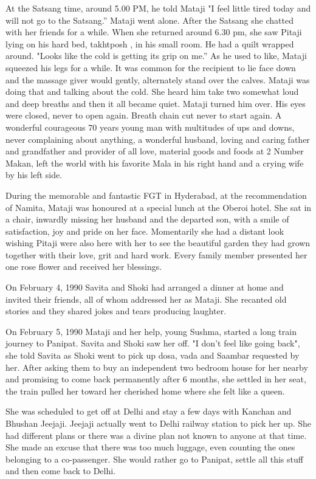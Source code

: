 At the Satsang time, around 5.00 PM, he told Mataji "I feel little tired
today and will not go to the Satsang.” Mataji went alone. After the
Satsang she chatted with her friends for a while. When she returned around
6.30 pm, she saw Pitaji lying on his hard bed, takhtposh , in his small
room. He had a quilt wrapped around. "Looks like the cold is getting its
grip on me.” As he used to like, Mataji squeezed his legs for a while. It
was common for the recipient to lie face down and the massage giver would
gently, alternately stand over the calves. Mataji was doing that and
talking about the cold. She heard him take two somewhat loud and deep
breaths and then it all became quiet. Mataji turned him over. His eyes
were closed, never to open again. Breath chain cut never to start again.
A wonderful courageous 70 years young man with multitudes of ups and
downs, never complaining about anything, a wonderful husband, loving and
caring father and grandfather and provider of all love, material goods and
foods at 2 Number Makan, left the world with his favorite Mala in his
right hand and a crying wife by his left side. 

During the memorable and fantastic FGT in Hyderabad, at the recommendation
of Namita, Mataji was honoured at a special lunch at the Oberoi hotel. She
sat in a chair, inwardly missing her husband and the departed son, with
a smile of satisfaction, joy and pride on her face. Momentarily she had
a distant look wishing Pitaji were also here with her to see the beautiful
garden they had grown together with their love, grit and hard work. Every
family member presented her one rose flower and received her blessings. 

On February 4, 1990 Savita and Shoki had arranged a dinner at home and
invited their friends, all of whom addressed her as Mataji. She recanted
old stories and they shared jokes and tears producing laughter. 

On February 5, 1990 Mataji and her help, young Sushma, started a long
train journey to Panipat. Savita and Shoki saw her off. "I don't feel like
going back", she told Savita as Shoki went to pick up dosa, vada and
Saambar requested by her. After asking them to buy an independent two
bedroom house for her nearby and promising to come back permanently after
6 months, she settled in her seat, the train pulled her toward her
cherished home where she felt like a queen. 

She was scheduled to get off at Delhi and stay a few days with Kanchan and
Bhushan Jeejaji. Jeejaji actually went to Delhi railway station to pick
her up. She had different plans or there was a divine plan not known to
anyone at that time. She made an excuse that there was too much luggage,
even counting the ones belonging to a co-passenger. She would rather go to
Panipat, settle all this stuff and then come back to Delhi. 

